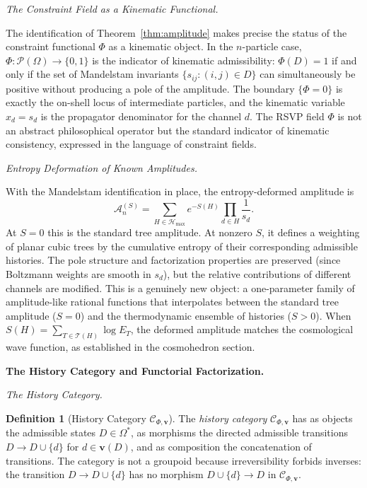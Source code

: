 \documentclass[12pt, oneside]{amsart}
\theoremstyle{plain}
\theoremstyle{definition}
\newtheorem{definition}[theorem]{Definition}
\theoremstyle{remark}
\newcommand{\Phif}{\Phi}
\newcommand{\Sf}{S}
\newcommand{\OmKS}{\Omega}
\newcommand{\Ccat}{\mathcal{C}_{\Phi,\mathbf{v}}}
\newcommand{\Hmax}{\mathcal{H}_{\max}}
\begin{document}
\medskip\noindent\textit{The Constraint Field as a Kinematic Functional.}

The identification of Theorem~\ref{thm:amplitude} makes precise the status
of the constraint functional $\Phif$ as a kinematic object. In the
$n$-particle case, $\Phif: \mathcal{P}(\OmKS) \to \{0,1\}$ is the
indicator of kinematic admissibility: $\Phif(D) = 1$ if and only if the
set of Mandelstam invariants $\{s_{ij} : (i,j) \in D\}$ can simultaneously
be positive without producing a pole of the amplitude. The boundary
$\{\Phif = 0\}$ is exactly the on-shell locus of intermediate particles,
and the kinematic variable $x_d = s_d$ is the propagator denominator for
the channel $d$. The RSVP field $\Phif$ is not an abstract philosophical
operator but the standard indicator of kinematic consistency, expressed in
the language of constraint fields.

\medskip\noindent\textit{Entropy Deformation of Known Amplitudes.}

With the Mandelstam identification in place, the entropy-deformed amplitude
is
\begin{equation}
\label{eq:deformed-amp}
  \mathcal{A}_n^{(\Sf)} = \sum_{H \in \Hmax} e^{-\Sf(H)}
  \prod_{d \in H} \frac{1}{s_d}.
\end{equation}
At $\Sf = 0$ this is the standard tree amplitude. At nonzero $\Sf$, it
defines a weighting of planar cubic trees by the cumulative entropy of
their corresponding admissible histories. The pole structure and
factorization properties are preserved (since Boltzmann weights are smooth
in $s_d$), but the relative contributions of different channels are
modified. This is a genuinely new object: a one-parameter family of
amplitude-like rational functions that interpolates between the standard
tree amplitude ($\Sf = 0$) and the thermodynamic ensemble of histories
($\Sf > 0$). When $\Sf(H) = \sum_{T \in \mathcal{T}(H)} \log E_T$, the
deformed amplitude matches the cosmological wave function, as established
in the cosmohedron section.


\bigskip\noindent\textbf{The History Category and Functorial Factorization.}
\label{sec:categorical}

\medskip\noindent\textit{The History Category.}

\begin{definition}[History Category $\Ccat$]
The \emph{history category} $\Ccat$ has as objects the admissible states $D \in \OmKS^*$, as morphisms the directed admissible transitions $D \to D \cup \{d\}$ for $d \in \mathbf{v}(D)$, and as composition the concatenation of transitions. The category is not a groupoid because irreversibility forbids inverses: the transition $D \to D \cup \{d\}$ has no morphism $D \cup \{d\} \to D$ in $\Ccat$.
\end{definition}
\end{document}
